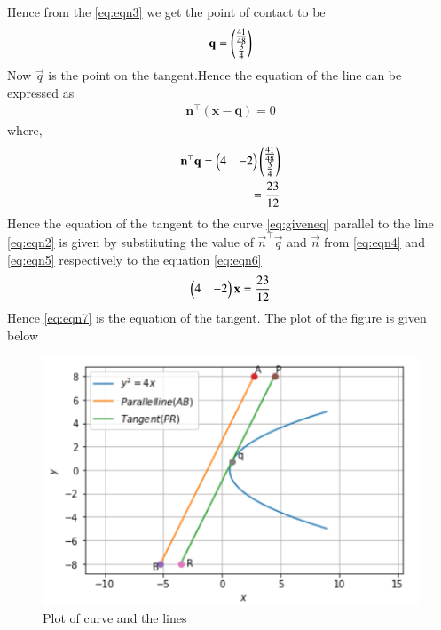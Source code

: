 \documentclass[journal,12pt,twocolumn]{IEEEtran}
\begin{document}
Hence from the \eqref{eq:eqn3} we get the point of contact to be 
\begin{align}
    \mathbf{q}=\begin{pmatrix}\frac{41}{48} \\ \frac{3}{4}\end{pmatrix}
\end{align}
Now $\vec{q}$ is the point on the tangent.Hence the equation of the line can be expressed as 
\begin{align}
    \mathbf{n}^{\top}(\mathbf{x}-\mathbf{q}) = 0\label{eq:eqn6}
\end{align}
where,
\begin{align}
\mathbf{n}^{\top}\mathbf{q}
    =\begin{pmatrix}4&-2\end{pmatrix}\begin{pmatrix}\frac{41}{48} \\ \frac{3}{4}\end{pmatrix} 
    \\
    = \frac{23}{12} \label{eq:eqn4}
\end{align}
Hence the equation of the tangent to the curve \eqref{eq:giveneq} parallel to the line \eqref{eq:eqn2} is given by substituting the value of $\vec{n}^{\top}\vec{q}$ and $\vec{n}$ from \eqref{eq:eqn4} and \eqref{eq:eqn5} respectively to the equation \eqref{eq:eqn6} 
\begin{align}
    \begin{pmatrix}4&-2\end{pmatrix}\mathbf{x}=\frac{23}{12} \label{eq:eqn7}
\end{align}
Hence \eqref{eq:eqn7} is the equation of the tangent.
The plot of the figure is given below

\begin{figure}[ht]
\centering
\includegraphics[width=\columnwidth]{Parabola.PNG}
\caption{Plot of curve and the lines}
\label{Plot of curve and the lines}
\end{figure}
\end{document}

